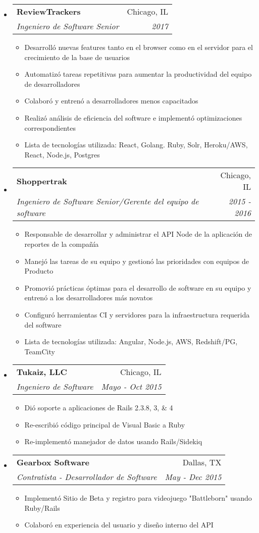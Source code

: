 \documentclass[letterpaper,11pt]{article}
\makeatletter
\newcommand{\resitem}[1]{\item #1 \vspace{-3pt}}
\newcommand{\ressubheading}[4]{
	\begin{tabular*}{6.5in}{l@{\extracolsep{\fill}}r}
			\textbf{#1} & #2 \\
			\textit{#3} & \textit{#4} \\
	\end{tabular*}\vspace{-6pt}}
\makeatother
\begin{document}
\begin{itemize}
\item
  \ressubheading{ReviewTrackers}{Chicago, IL}{Ingeniero de Software Senior}{2017}
	\begin{itemize}
    \resitem{Desarrolló nuevas features tanto en el browser como en el servidor para el crecimiento de la base de usuarios}
    \resitem{Automatizó tareas repetitivas para aumentar la productividad del equipo de desarrolladores }
    \resitem{Colaboró y entrenó a desarrolladores menos capacitados}
    \resitem{Realizó análisis de eficiencia del software e implementó optimizaciones correspondientes}
        \resitem{Lista de tecnologías utilizada: React, Golang. Ruby, Solr, Heroku/AWS, React, Node.js, Postgres}
	\end{itemize}

\item
  \ressubheading{Shoppertrak}{Chicago, IL}{Ingeniero de Software Senior/Gerente del equipo de software}{2015 - 2016}
	\begin{itemize}
    \resitem{Responsable de desarrollar y administrar el API Node de la aplicación de reportes de la compañía}
    \resitem{Manejó las tareas de su equipo y gestionó las prioridades con equipos de Producto }
    \resitem{Promovió prácticas óptimas para el desarrollo de software en su equipo y entrenó a los desarrolladores más novatos}
    \resitem{Configuró herramientas CI y servidores para la infraestructura requerida del software}
     \resitem{Lista de tecnologías utilizada: Angular, Node.js, AWS, Redshift/PG, TeamCity}
	\end{itemize}


\item
	\ressubheading{Tukaiz, LLC}{Chicago, IL}{Ingeniero de Software}{Mayo - Oct 2015}
	\begin{itemize}
		\resitem{Dió soporte a aplicaciones de Rails 2.3.8, 3, \& 4 }
		\resitem{Re-escribió código principal de Visual Basic a Ruby}
		\resitem{Re-implementó manejador de datos usando Rails/Sidekiq}
	\end{itemize}

\item 
	\ressubheading{Gearbox Software}{Dallas, TX}{Contratista - Desarrollador de Software}{May - Dec 2015}
	\begin{itemize}
		\resitem{Implementó Sitio de Beta y registro para videojuego "Battleborn" usando Ruby/Rails}
		\resitem{Colaboró en experiencia del usuario y diseño interno del API}
	\end{itemize}




\end{itemize}
\end{document}
